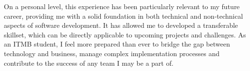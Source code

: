 On a personal level, this experience has been particularly relevant to my future career, providing me with a solid foundation in both technical and non-technical aspects of software development. It has allowed me to developed a transferable skillset, which can be directly applicable to upcoming projects and challenges. As an ITMB student, I feel more prepared than ever to bridge the gap between technology and business, manage complex implementation processes and contribute to the success of any team I may be a part of. 